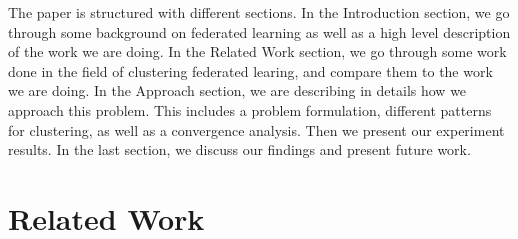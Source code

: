 \documentclass[10pt,twocolumn,letterpaper]{article}
\theoremstyle{definition}
\begin{document}
The paper is structured with different sections. In the Introduction section, we go through some background on federated learning as well as a high level description of the work we are doing. In the Related Work section, we go through some work done in the field of clustering federated learing, and compare them to the work we are doing. In the Approach section, we are describing in details how we approach this problem. This includes a problem formulation, different patterns for clustering, as well as a convergence analysis. Then we present our experiment results. In the last section, we discuss our findings and present future work.

\section{Related Work}


\end{document}
